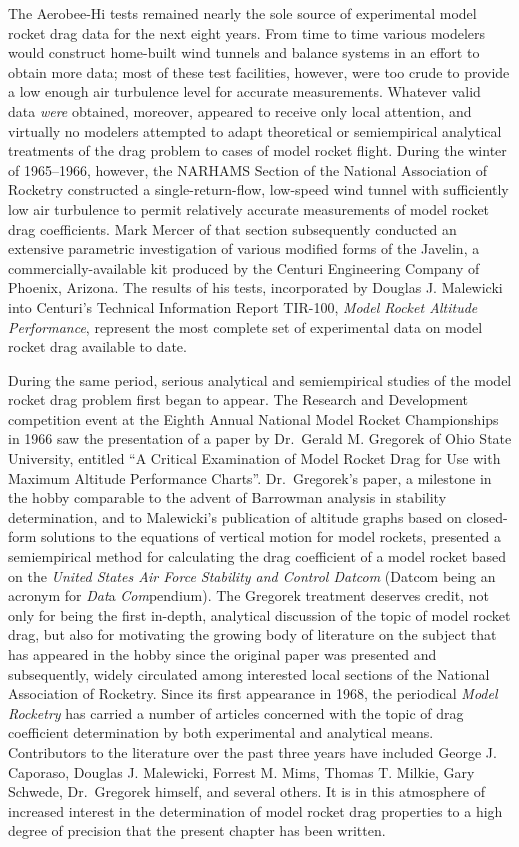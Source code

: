 The Aerobee-Hi tests remained nearly the sole source of experimental model
rocket drag data for the next eight years. From time to time various modelers
would construct home-built wind tunnels and balance systems in an effort to
obtain more data; most of these test facilities, however, were too crude to
provide a low enough air turbulence level for accurate measurements. Whatever
valid data \emph{were} obtained, moreover, appeared to receive only local
attention, and virtually no modelers attempted to adapt theoretical or
semiempirical analytical treatments of the drag problem to cases of model
rocket flight. During the winter of 1965--1966, however, the NARHAMS Section of
the National Association of Rocketry constructed a single-return-flow,
low-speed wind tunnel with sufficiently low air turbulence to permit relatively
accurate measurements of model rocket drag coefficients. Mark Mercer of that
section subsequently conducted an extensive parametric investigation of
various modified forms of the Javelin, a commercially-available kit produced
by the Centuri Engineering Company of Phoenix, Arizona. The results of his
tests, incorporated by Douglas J. Malewicki into Centuri's Technical
Information Report TIR-100, \emph{Model Rocket Altitude Performance}, represent
the most complete set of experimental data on model rocket drag available to
date.

During the same period, serious analytical and semiempirical studies of the
model rocket drag problem first began to appear. The Research and Development
competition event at the Eighth Annual National Model Rocket Championships in
1966 saw the presentation of a paper by Dr.~Gerald M. Gregorek of Ohio State
University, entitled ``A Critical Examination of Model Rocket Drag for Use
with Maximum Altitude Performance Charts''. Dr.~Gregorek's paper, a milestone
in the hobby comparable to the advent of Barrowman analysis in stability
determination, and to Malewicki's publication of altitude graphs based on
closed-form solutions to the equations of vertical motion for model rockets,
presented a semiempirical method for calculating the drag coefficient of a
model rocket based on the \emph{United States Air Force Stability and Control
Datcom} (Datcom being an acronym for \emph{Dat}a \emph{Com}pendium). The
Gregorek treatment deserves credit, not only for being the first in-depth,
analytical discussion of the topic of model rocket drag, but also for
motivating the growing body of literature on the subject that has appeared in
the hobby since the original paper was presented and subsequently, widely
circulated among interested local sections of the National Association of
Rocketry. Since its first appearance in 1968, the periodical \emph{Model
Rocketry} has carried a number of articles concerned with the topic of drag
coefficient determination by both experimental and analytical means.
Contributors to the literature over the past three years have included George
J. Caporaso, Douglas J. Malewicki, Forrest M. Mims, Thomas T. Milkie, Gary
Schwede, Dr.~Gregorek himself, and several others. It is in this atmosphere of
increased interest in the determination of model rocket drag properties to a
high degree of precision that the present chapter has been written.

